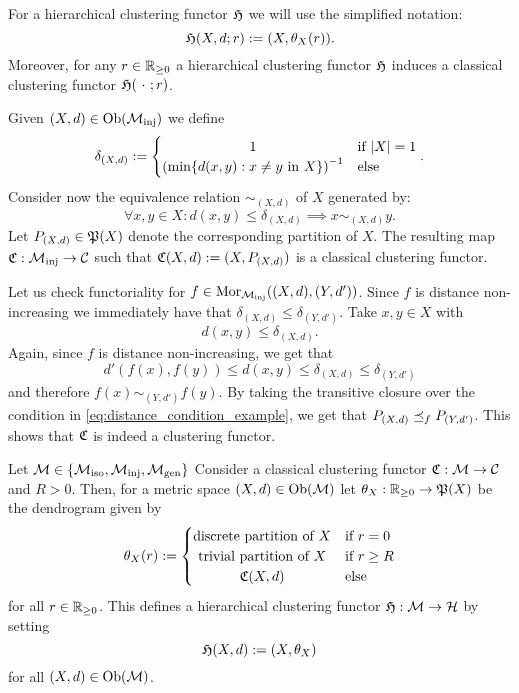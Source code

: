 For a hierarchical clustering functor $\Hf$ we will use the simplified notation:
$$
\Hf(X,d;r) := (X,\theta_X(r)).
$$
Moreover, for any $r \in \R_{\geq0}$ a hierarchical clustering functor $\Hf$ induces a classical clustering functor $\Hf(\ \cdot \ ;r)$.

\begin{example}{\cite[Ex.~6.1]{Carlsson2010}}{}
Given $(X,d) \in \ob(\inj)$ we define
$$
\delta_{(X,d)} := \begin{cases}
    \hfil 1 & \text{if $|X| = 1$} \\
    \left(\min\{d(x,y): x \neq y \text{ in } X\}\right)^{-1} & \text{else}
\end{cases}.
$$
Consider now the equivalence relation $\sim_{(X,d)}$ of $X$ generated by:
$$
\forall x,y \in X: d(x,y) \leq \delta_{(X,d)} \implies x \sim_{(X,d)} y.
$$
Let $P_{(X,d)} \in \P(X)$ denote the corresponding partition of $X$.
The resulting map $\Cf: \inj \to \C$ such that $\Cf(X,d) := (X, P_{(X,d)})$ is a classical clustering functor.

\medskip
Let us check functoriality for $f \in \mor_\inj((X,d),(Y,d'))$. Since $f$ is distance non-increasing we immediately have that $\delta_{(X,d)} \leq \delta_{(Y,d')}$. Take $x,y \in X$ with
\begin{equation}
    d(x,y) \leq \delta_{(X,d)}.
    \label{eq:distance_condition_example}
\end{equation}
Again, since $f$ is distance non-increasing, we get that
$$
d'(f(x),f(y)) \leq d(x,y) \leq \delta_{(X,d)} \leq \delta_{(Y,d')}
$$
and therefore $f(x) \sim_{(Y,d')} f(y)$. By taking the transitive closure over the condition in \eqref{eq:distance_condition_example}, we get that $P_{(X,d)} \refines_f P_{(Y,d')}$.
This shows that $\Cf$ is indeed a clustering functor.
\end{example}

\begin{example}{}{}
Let $\M \in \{\iso, \inj, \gen\}$
Consider a classical clustering functor $\Cf: \M \to \C$ and $R > 0$.
Then, for a metric space ${(X,d) \in \ob(\M)}$ let $\theta_X: \R_{\geq0} \to \P(X)$ be the dendrogram given by
$$
\theta_X(r) :=
\begin{cases}
    \text{discrete partition of $X$}& \text{if $r = 0$} \\
    \hfil \text{trivial partition of $X$}& \text{if $r \geq R$} \\
    \hfil \Cf(X,d) & \text{else}
\end{cases}
$$
for all $r \in \R_{\geq0}$. 
This defines a hierarchical clustering functor $\Hf: \M \to \H$ by setting
$$
\Hf(X,d) := (X,\theta_X)
$$
for all $(X,d) \in \ob(\M)$.
\end{example}

